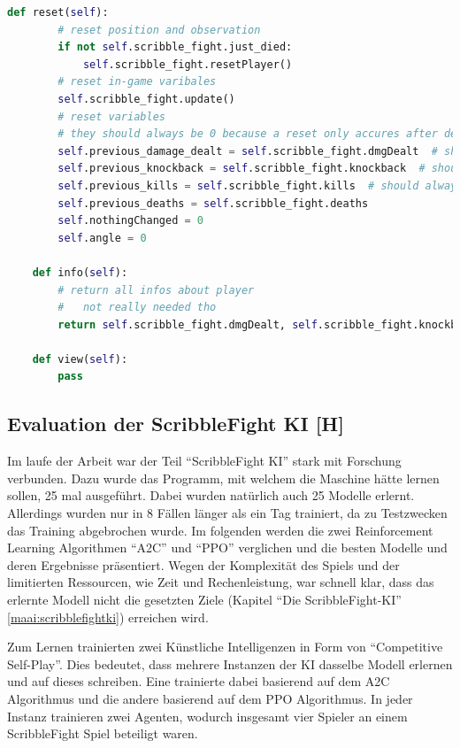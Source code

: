 \begin{lstlisting}[language=Python,firstnumber=182]
    def reset(self):
        # reset position and observation
        if not self.scribble_fight.just_died:
            self.scribble_fight.resetPlayer()
        # reset in-game varibales
        self.scribble_fight.update()
        # reset variables
        # they should always be 0 because a reset only accures after death or as initialisation
        self.previous_damage_dealt = self.scribble_fight.dmgDealt  # should always be 0
        self.previous_knockback = self.scribble_fight.knockback  # should always be 1
        self.previous_kills = self.scribble_fight.kills  # should always be 0
        self.previous_deaths = self.scribble_fight.deaths
        self.nothingChanged = 0
        self.angle = 0

    def info(self):
        # return all infos about player
        #   not really needed tho
        return self.scribble_fight.dmgDealt, self.scribble_fight.knockback, self.scribble_fight.kills, self.scribble_fight.deaths

    def view(self):
        pass

\end{lstlisting}

\subsection{Evaluation der ScribbleFight KI [H]}

Im laufe der Arbeit war der Teil ``ScribbleFight KI'' stark mit Forschung verbunden. Dazu wurde das Programm,
mit welchem die Maschine hätte lernen sollen, 25 mal ausgeführt. Dabei wurden natürlich auch 25 Modelle erlernt.
Allerdings wurden nur in 8 Fällen länger als ein Tag trainiert, da zu Testzwecken das Training abgebrochen wurde.
Im folgenden werden die zwei Reinforcement Learning Algorithmen ``A2C'' und ``PPO'' verglichen und die besten Modelle
und deren Ergebnisse präsentiert. Wegen der Komplexität des Spiels und der limitierten Ressourcen, wie Zeit und Rechenleistung,
war schnell klar, dass das erlernte Modell nicht die gesetzten Ziele (Kapitel ``Die ScribbleFight-KI'' \ref{maai:scribblefightki}) erreichen wird.

Zum Lernen trainierten zwei Künstliche Intelligenzen in Form von ``Competitive Self-Play''. Dies bedeutet,
dass mehrere Instanzen der KI dasselbe Modell erlernen und auf dieses schreiben. Eine trainierte dabei basierend auf dem
A2C Algorithmus und die andere basierend auf dem PPO Algorithmus. In jeder Instanz trainieren zwei Agenten,
wodurch insgesamt vier Spieler an einem ScribbleFight Spiel beteiligt waren.

